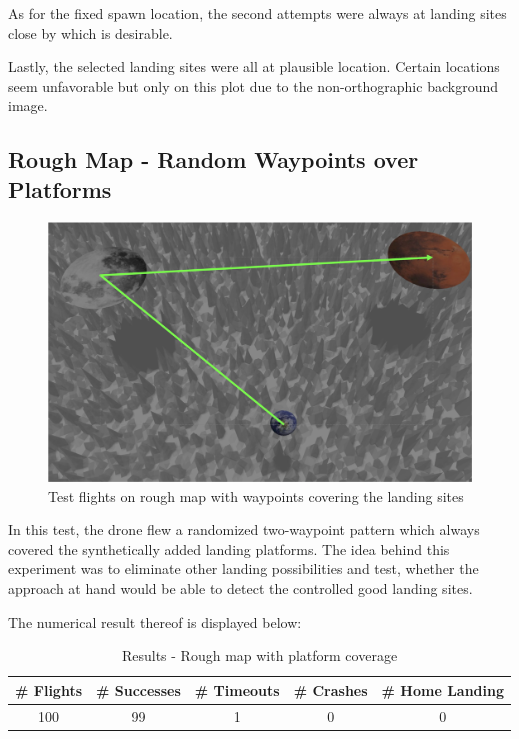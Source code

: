     As for the fixed spawn location, the second attempts were always at landing sites close by which is desirable.

    Lastly, the selected landing sites were all at plausible location. Certain locations seem unfavorable but only on this plot due to the non-orthographic background image.

\subsection{Rough Map - Random Waypoints over Platforms}\label{subsec:rough_coverage}
        \begin{figure}[h]
            \centering
            \includegraphics[scale=0.24]{images/evaluation/rough_over_platforms.png}
            \caption{Test flights on rough map with waypoints covering the landing sites}
            \label{fig:rough_covered}
        \end{figure}

        In this test, the drone flew a randomized two-waypoint pattern which always covered the synthetically added landing platforms. The idea behind this experiment was to eliminate other landing possibilities and test, whether the approach at hand would be able to detect the controlled good landing sites.

        The numerical result thereof is displayed below:

        \begin{table}[h]
            \begin{center}
             \caption{Results - Rough map with platform coverage}\vspace{1ex}
             \label{tab:result_rough_covered}
             \begin{tabular}{|c|c|c|c|c|}
             \hline
             \# Flights & \# Successes & \# Timeouts & \# Crashes & \# Home Landing\\ \hline \hline
             100 & 99 & 1 & 0 & 0 \\
             \hline
             \end{tabular}
            \end{center}
        \end{table}

